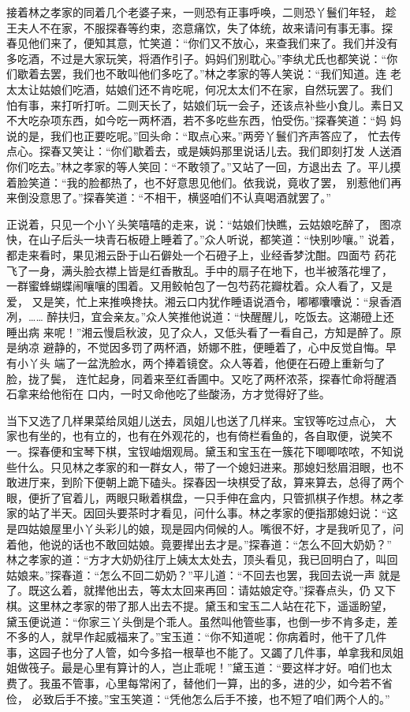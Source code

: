 接着林之孝家的同着几个老婆子来，一则恐有正事呼唤，二则恐丫鬟们年轻，
趁王夫人不在家，不服探春等约束，恣意痛饮，失了体统，故来请问有事无事。探
春见他们来了，便知其意，忙笑道：“你们又不放心，来查我们来了。我们并没有
多吃酒，不过是大家玩笑，将酒作引子。妈妈们别耽心。”李纨尤氏也都笑说：“你
们歇着去罢，我们也不敢叫他们多吃了。”林之孝家的等人笑说：“我们知道。连
老太太让姑娘们吃酒，姑娘们还不肯吃呢，何况太太们不在家，自然玩罢了。我们
怕有事，来打听打听。二则天长了，姑娘们玩一会子，还该点补些小食儿。素日又
不大吃杂项东西，如今吃一两杯酒，若不多吃些东西，怕受伤。”探春笑道：“妈
妈说的是，我们也正要吃呢。”回头命：“取点心来。”两旁丫鬟们齐声答应了，
忙去传点心。探春又笑让：“你们歇着去，或是姨妈那里说话儿去。我们即刻打发
人送酒你们吃去。”林之孝家的等人笑回：“不敢领了。”又站了一回，方退出去
了。平儿摸着脸笑道：“我的脸都热了，也不好意思见他们。依我说，竟收了罢，
别惹他们再来倒没意思了。”探春笑道：“不相干，横竖咱们不认真喝酒就罢了。”

正说着，只见一个小丫头笑嘻嘻的走来，说：“姑娘们快瞧，云姑娘吃醉了，
图凉快，在山子后头一块青石板磴上睡着了。”众人听说，都笑道：“快别吵嚷。”
说着，都走来看时，果见湘云卧于山石僻处一个石磴子上，业经香梦沈酣。四面芍
药花飞了一身，满头脸衣襟上皆是红香散乱。手中的扇子在地下，也半被落花埋了，
一群蜜蜂蝴蝶闹嚷嚷的围着。又用鲛帕包了一包芍药花瓣枕着。众人看了，又是爱，
又是笑，忙上来推唤搀扶。湘云口内犹作睡语说酒令，嘟嘟囔囔说：“泉香酒冽，……
醉扶归，宜会亲友。”众人笑推他说道：“快醒醒儿，吃饭去。这潮磴上还睡出病
来呢！”湘云慢启秋波，见了众人，又低头看了一看自己，方知是醉了。原是纳凉
避静的，不觉因多罚了两杯酒，娇娜不胜，便睡着了，心中反觉自悔。早有小丫头
端了一盆洗脸水，两个捧着镜奁。众人等着，他便在石磴上重新匀了脸，拢了鬓，
连忙起身，同着来至红香圃中。又吃了两杯浓茶，探春忙命将醒酒石拿来给他衔在
口内，一时又命他吃了些酸汤，方才觉得好了些。

当下又选了几样果菜给凤姐儿送去，凤姐儿也送了几样来。宝钗等吃过点心，
大家也有坐的，也有立的，也有在外观花的，也有倚栏看鱼的，各自取便，说笑不
一。探春便和宝琴下棋，宝钗岫烟观局。黛玉和宝玉在一簇花下唧唧哝哝，不知说
些什么。只见林之孝家的和一群女人，带了一个媳妇进来。那媳妇愁眉泪眼，也不
敢进厅来，到阶下便朝上跪下磕头。探春因一块棋受了敌，算来算去，总得了两个
眼，便折了官着儿，两眼只瞅着棋盘，一只手伸在盒内，只管抓棋子作想。林之孝
家的站了半天。因回头要茶时才看见，问什么事。林之孝家的便指那媳妇说：“这
是四姑娘屋里小丫头彩儿的娘，现是园内伺候的人。嘴很不好，才是我听见了，问
着他，他说的话也不敢回姑娘。竟要撵出去才是。”探春道：“怎么不回大奶奶？”
林之孝家的道：“方才大奶奶往厅上姨太太处去，顶头看见，我已回明白了，叫回
姑娘来。”探春道：“怎么不回二奶奶？”平儿道：“不回去也罢，我回去说一声
就是了。既这么着，就撵他出去，等太太回来再回：请姑娘定夺。”探春点头，仍
又下棋。这里林之孝家的带了那人出去不提。黛玉和宝玉二人站在花下，遥遥盼望，
黛玉便说道：“你家三丫头倒是个乖人。虽然叫他管些事，也倒一步不肯多走，差
不多的人，就早作起威福来了。”宝玉道：“你不知道呢：你病着时，他干了几件
事，这园子也分了人管，如今多掐一根草也不能了。又蠲了几件事，单拿我和凤姐
姐做筏子。最是心里有算计的人，岂止乖呢！”黛玉道：“要这样才好。咱们也太
费了。我虽不管事，心里每常闲了，替他们一算，出的多，进的少，如今若不省俭，
必致后手不接。”宝玉笑道：“凭他怎么后手不接，也不短了咱们两个人的。”

